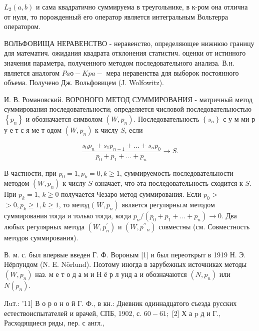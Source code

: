 \documentclass[10pt]{article}
\begin{document}
$L_{2}(a, b)$ и сама квадратично суммируема в треугольнике, в к-ром она отлична от нуля, то порожденный его оператор является интегральным Вольтерра оператором.



ВОЛЬФОВИЩА НЕРАВЕНСТВО - неравенство, определяющее нижнюю границу для математич. ожидания квадрата отклонения статистич. оценки от истинного значения параметра, полученного методом последовательного анализа. В.н. является аналогом $P a о-K p a-$ мера неравенства для выборок постоянного объема. Получено Дж. Вольфовицем (J. Wolfowitz).



И. В. Романовский. ВОРОНОГО МЕТОД СУММИРОВАНИЯ - матричный метод суммирования последовательности; определяется числовой последовательностью $\left\{p_{n}\right\}$ и обозначается символом $\left(W, p_{n}\right)$. Последовательность $\left\{s_{n}\right\}$ с у м ми р у е т с я ме т одом $\left(W, p_{n}\right)$ к числу $S$, если



\[

\frac{s_{0} p_{n}+s_{1} p_{n-1}+\ldots+s_{n} p_{0}}{p_{0}+p_{1}+\ldots+p_{n}} \longrightarrow S .

\]



В частности, при $p_{0}=1, p_{k}=0, k \geqslant 1$, суммируемость последовательности методом $\left(W, p_{n}\right)$ к числу $S$ означает, что әта последовательность сходится к $S$. При $p_{k}=1$, $k \geqslant 0$ получается Чезаро метод суммирования. Если $p_{0}>$ $>0, p_{k} \geqslant 1, k \geqslant 1$, то метод ( $\left.W, p_{n}\right)$ является регулярны.м методом суммирования тогда и только тогда, когда $p_{n} /\left(p_{0}+p_{1}+\ldots+p_{n}\right) \rightarrow 0$. Два любых регулярных метода $\left(W, p_{n}^{\prime}\right)$ и $\left(W, p^{\prime \prime}{ }_{n}\right)$ совместны (см. Совместность методов суммирования).



В. м. с. был впервые введен Г. Ф. Вороным [1] и был переоткрыт в 1919 Н. Э. Нёрлундом (N. E. Nörlund). Поэтому иногда в зарубежных источниках методы $\left(W, p_{n}\right)$ наз. м е т о д а м и Н ё р л унд а и обозначаются $\left(N, p_{n}\right)$ или $N\left(p_{n}\right)$.



Лuт.: '11] В о р о н о й Г. Ф., в кн.: Дневник одиннадцатого съезда русских естествоиспытателей и врачей, СПБ, 1902, с. $60-61 ;$ [2] Х а p д и Г., Расходящиеся ряды, пер. с англ.,
\end{document}
